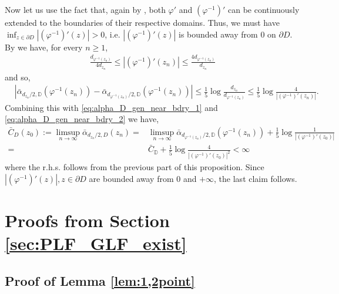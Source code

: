 \documentclass[a4paper, 11pt, reqno]{amsart}
\theoremstyle{definition} \newtheorem{defn}{Definition}[section]
\theoremstyle{remark} \newtheorem{rem}[defn]{Remark}
\theoremstyle{remark} \newtheorem*{rem*}{Remark}
\theoremstyle{plain} \newtheorem{thm}[defn]{Theorem}
\theoremstyle{plain} \newtheorem{lem}[defn]{Lemma}
\theoremstyle{plain} \newtheorem{prop}[defn]{Proposition}
\theoremstyle{plain} \newtheorem{cor}[defn]{Corollary}
\theoremstyle{remark} \newtheorem{exm}[defn]{\textbf{Example}}
\theoremstyle{remark} \newtheorem{exms}[defn]{\textbf{Examples}}
\theoremstyle{remark} \newtheorem*{bl}{}
\numberwithin{equation}{section} %
\newcommand{\D}{\mathbb{D}}
\begin{document}
    Now let us use the fact that, again by \cite[Theorem 3.5]{pommerenke92}, both $\varphi'$ and $(\varphi^{-1})'$ can be continuously extended to the boundaries of their respective domains. Thus, we must have $\inf_{z \in \partial D} |(\varphi^{-1})'(z)| >0$, i.e. $|(\varphi^{-1})'(z)|$ is bounded away from $0$ on $\partial D$. By \cite[Corollary 3.19]{lawler05} we have, for every $n \ge 1$,
      \begin{align}
          \frac{d_{\varphi^{-1} (z_n)}}{4 d_{z_n}} \le |(\varphi^{-1})'(z_n)| \le \frac{4 d_{\varphi^{-1} (z_n)}}{ d_{z_n}}
      \end{align}       
      and so, 
      \begin{align}
           & |\bar{\alpha}_{ d_{z_n}/2, \D} (\varphi^{-1}(z_n)) - \bar{\alpha}_{ d_{\varphi^{-1}(z_n)}/2, \D} (\varphi^{-1}(z_n)) | 
          \le \frac{1}{5} \log \frac{d_{z_n}}{d_{\varphi^{-1}(z_n)}} \le \frac{1}{5} \log \frac{4}{|(\varphi^{-1})'(z_n)|} .
      \end{align}
      Combining this with \eqref{eq:alpha_D_gen_near_bdry_1} and \eqref{eq:alpha_D_gen_near_bdry_2} we have,
      \begin{align}
          \bar{C}_D(z_0) := \limsup_{n \to \infty} \bar{\alpha}_{d_{z_n}/2, D}(z_n)  = & \limsup_{n \to \infty} \bar{\alpha}_{d_{\varphi^{-1}(z_n)}/2, \D} (\varphi^{-1}(z_n)) + \frac{1}{5} \log \frac{1}{|(\varphi^{-1})'(z_0)|}
          \nonumber \\
          = & \bar{C}_{\D} + \frac{1}{5} \log \frac{4}{|(\varphi^{-1})'(z_0)|^2}  < \infty
      \end{align}
      where the r.h.s. follows from the previous part of this proposition. Since $|(\varphi^{-1})'(z)|, z \in \partial D$ are bounded away from $0$ and $+\infty$, the last claim follows.
    
    \section{Proofs from Section \ref{sec:PLF_GLF_exist}} \label{app:proofs_corr_fns}

    \subsection{Proof of Lemma \ref{lem:1,2point}}\label{app:proof_lem:1,2point}
\end{document}
